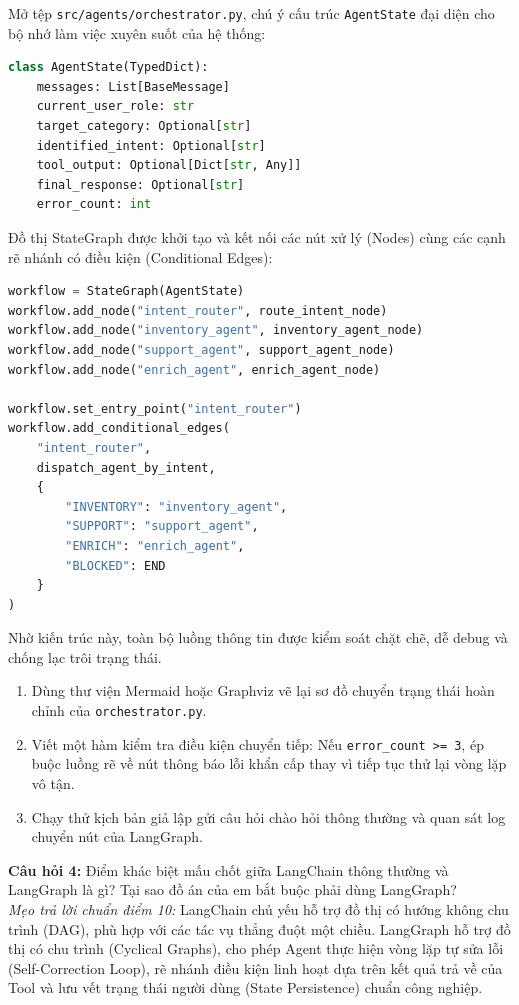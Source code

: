 \begin{codeautopsybox}
Mở tệp \texttt{src/agents/orchestrator.py}, chú ý cấu trúc \texttt{AgentState} đại diện cho bộ nhớ làm việc xuyên suốt của hệ thống:
\begin{lstlisting}[language=Python]
class AgentState(TypedDict):
    messages: List[BaseMessage]
    current_user_role: str
    target_category: Optional[str]
    identified_intent: Optional[str]
    tool_output: Optional[Dict[str, Any]]
    final_response: Optional[str]
    error_count: int
\end{lstlisting}
Đồ thị StateGraph được khởi tạo và kết nối các nút xử lý (Nodes) cùng các cạnh rẽ nhánh có điều kiện (Conditional Edges):
\begin{lstlisting}[language=Python]
workflow = StateGraph(AgentState)
workflow.add_node("intent_router", route_intent_node)
workflow.add_node("inventory_agent", inventory_agent_node)
workflow.add_node("support_agent", support_agent_node)
workflow.add_node("enrich_agent", enrich_agent_node)

workflow.set_entry_point("intent_router")
workflow.add_conditional_edges(
    "intent_router",
    dispatch_agent_by_intent,
    {
        "INVENTORY": "inventory_agent",
        "SUPPORT": "support_agent",
        "ENRICH": "enrich_agent",
        "BLOCKED": END
    }
)
\end{lstlisting}
Nhờ kiến trúc này, toàn bộ luồng thông tin được kiểm soát chặt chẽ, dễ debug và chống lạc trôi trạng thái.
\end{codeautopsybox}

\begin{labmilestonebox}
\begin{enumerate}[leftmargin=1.5em]
    \item Dùng thư viện Mermaid hoặc Graphviz vẽ lại sơ đồ chuyển trạng thái hoàn chỉnh của \texttt{orchestrator.py}.
    \item Viết một hàm kiểm tra điều kiện chuyển tiếp: Nếu \texttt{error\_count >= 3}, ép buộc luồng rẽ về nút thông báo lỗi khẩn cấp thay vì tiếp tục thử lại vòng lặp vô tận.
    \item Chạy thử kịch bản giả lập gửi câu hỏi chào hỏi thông thường và quan sát log chuyển nút của LangGraph.
\end{enumerate}
\end{labmilestonebox}

\begin{checkpointbox}
\textbf{Câu hỏi 4:} Điểm khác biệt mấu chốt giữa LangChain thông thường và LangGraph là gì? Tại sao đồ án của em bắt buộc phải dùng LangGraph?\\
\textit{Mẹo trả lời chuẩn điểm 10:} LangChain chủ yếu hỗ trợ đồ thị có hướng không chu trình (DAG), phù hợp với các tác vụ thẳng đuột một chiều. LangGraph hỗ trợ đồ thị có chu trình (Cyclical Graphs), cho phép Agent thực hiện vòng lặp tự sửa lỗi (Self-Correction Loop), rẽ nhánh điều kiện linh hoạt dựa trên kết quả trả về của Tool và lưu vết trạng thái người dùng (State Persistence) chuẩn công nghiệp.
\end{checkpointbox}

